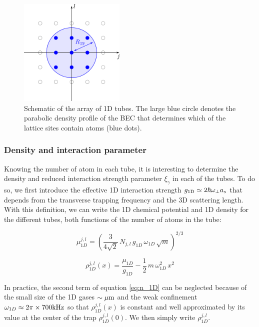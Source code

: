 \begin{figure}
    \centering
    \includegraphics[width=0.45\textwidth]{Fig/Chapter5/tubes_occupes.png}
    \caption{Schematic of the array of 1D tubes. The large blue circle denotes the parabolic density profile of the BEC that determines which of the lattice sites contain atoms (blue dots).}
    \label{fig:my_label}
\end{figure}

\subsubsection{Density and interaction parameter}


Knowing the number of atom in each tube, it is interesting to determine the density and reduced interaction strength parameter $\xi_{\gamma}$ in each of the tubes. To do so, we first introduce the effective 1D interaction strength $g_{\rm{1D}} \simeq 2 \hbar \omega_{\perp} a_s$ \cite{olshanii1998atomic} that depends from the transverse trapping frequency and the 3D scattering length. With this definition, we can write the 1D chemical potential and 1D density for the different tubes, both functions of the number of atoms in the tube:

\begin{equation}
    \mu_{1D}^{j,l} = \left( \frac{3}{4 \sqrt{2}} \, N_{j,l}\,  g_{1D} \, \omega_{1D}\,  \sqrt{m} \right)^{2/3}
\end{equation}

\begin{equation}\label{eq:n_1D}
    \rho_{1D}^{j,l}(x) = \frac{\mu_{1D}}{g_{1D}} - \frac{1}{2} \, m \, \omega_{1D}^2 \, x^2
\end{equation}

\noindent In practice, the second term of equation \ref{eq:n_1D} can be neglected because of the small size of the 1D gases $\sim \mu \rm{m}$ and the weak confinement $\omega_{1D} \approx 2 \pi \times 700 \rm{kHz}$ so that $\rho_{1D}^{j,l}(x)$ is constant and well approximated by its value at the center of the trap $\rho_{1D}^{j,l}(0)$. We then simply write $\rho_{1D}^{j,l}$.


